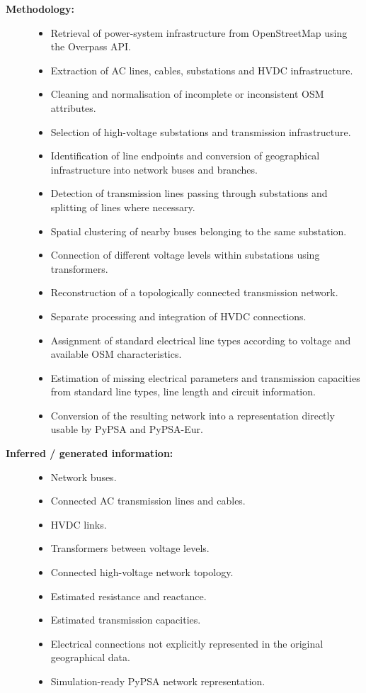 \begin{description}
    \item[\textbf{Methodology:}] \hfill
    \begin{itemize}
        \item Retrieval of power-system infrastructure from OpenStreetMap
        using the Overpass API.
        \item Extraction of AC lines, cables, substations and HVDC
        infrastructure.
        \item Cleaning and normalisation of incomplete or inconsistent OSM
        attributes.
        \item Selection of high-voltage substations and transmission
        infrastructure.
        \item Identification of line endpoints and conversion of geographical
        infrastructure into network buses and branches.
        \item Detection of transmission lines passing through substations and
        splitting of lines where necessary.
        \item Spatial clustering of nearby buses belonging to the same
        substation.
        \item Connection of different voltage levels within substations using
        transformers.
        \item Reconstruction of a topologically connected transmission
        network.
        \item Separate processing and integration of HVDC connections.
        \item Assignment of standard electrical line types according to
        voltage and available OSM characteristics.
        \item Estimation of missing electrical parameters and transmission
        capacities from standard line types, line length and circuit
        information.
        \item Conversion of the resulting network into a representation
        directly usable by PyPSA and PyPSA-Eur.
    \end{itemize}

    \item[\textbf{Inferred / generated information:}] \hfill
    \begin{itemize}
        \item Network buses.
        \item Connected AC transmission lines and cables.
        \item HVDC links.
        \item Transformers between voltage levels.
        \item Connected high-voltage network topology.
        \item Estimated resistance and reactance.
        \item Estimated transmission capacities.
        \item Electrical connections not explicitly represented in the
        original geographical data.
        \item Simulation-ready PyPSA network representation.
    \end{itemize}


\end{description}

